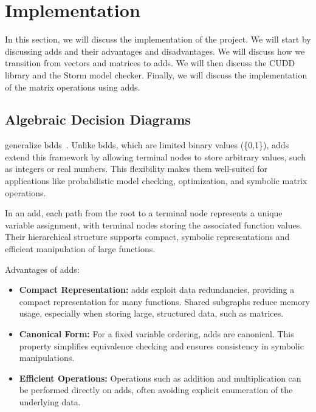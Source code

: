 \section{Implementation}\label{sec:implementation}
In this section, we will discuss the implementation of the project.
We will start by discussing \glspl{add} and their advantages and disadvantages.
We will discuss how we transition from vectors and matrices to \glspl{add}.
We will then discuss the CUDD library and the Storm model checker.
Finally, we will discuss the implementation of the matrix operations using \glspl{add}.


\subsection{Algebraic Decision Diagrams}\label{subsec:algebraic-decision-diagrams}
 generalize \glspl{bdd}~\cite{bahar1997algebric}.
Unlike \glspl{bdd}, which are limited binary values (\{0,1\}), \glspl{add} extend this framework by allowing terminal nodes to store arbitrary values, such as integers or real numbers. 
This flexibility makes them well-suited for applications like probabilistic model checking, optimization, and symbolic matrix operations.

In an \gls{add}, each path from the root to a terminal node represents a unique variable assignment, with terminal nodes storing the associated function values.
Their hierarchical structure supports compact, symbolic representations and efficient manipulation of large functions.

Advantages of \glspl{add}:
\begin{itemize}
\item \textbf{Compact Representation:} \glspl{add} exploit data redundancies, providing a compact representation for many functions. Shared subgraphs reduce memory usage, especially when storing large, structured data, such as matrices.
\item \textbf{Canonical Form:} For a fixed variable ordering, \glspl{add} are canonical. This property simplifies equivalence checking and ensures consistency in symbolic manipulations.
\item \textbf{Efficient Operations:} Operations such as addition and multiplication can be performed directly on \glspl{add}, often avoiding explicit enumeration of the underlying data.
\end{itemize}


